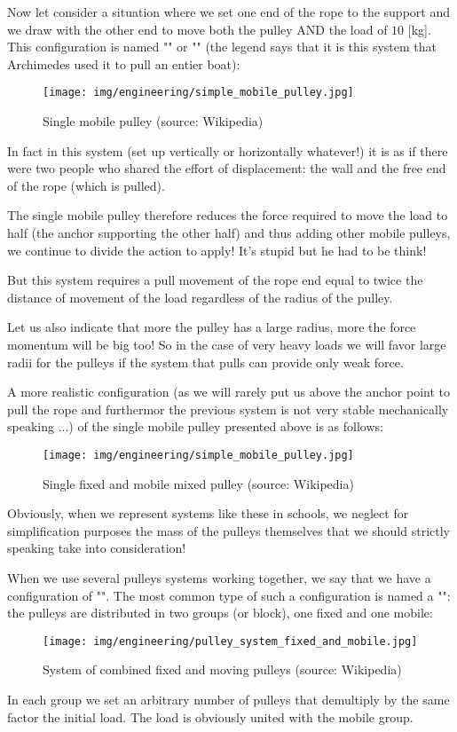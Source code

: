 	Now let consider a situation where we set one end of the rope to the support and we draw with the other end to move both the pulley AND the load of $10$ [kg]. This configuration is named "" or "" (the legend says that it is this system that Archimedes used it to pull an entier boat):
	\begin{figure}[H]
		\centering
		\texttt{[image: img/engineering/simple\_mobile\_pulley.jpg]}
		\caption{Single mobile pulley (source: Wikipedia)}
	\end{figure}
	In fact in this system (set up vertically or horizontally whatever!) it is as if there were two people who shared the effort of displacement: the wall and the free end of the rope (which is pulled).
	
	The single mobile pulley therefore reduces the force required to move the load to half (the anchor supporting the other half) and thus adding other mobile pulleys, we continue to divide the action to apply! It's stupid but he had to be think!
	
	But this system requires a pull movement of the rope end equal to twice the distance of movement of the load regardless of the radius of the pulley.
	
	Let us also indicate that more the pulley has a large radius, more the force momentum will be big too! So in the case of very heavy loads we will favor large radii for the pulleys if the system that pulls can provide only weak force.
	
	A more realistic configuration (as we will rarely put us above the anchor point to pull the rope and furthermor the previous system is not very stable mechanically speaking ...) of the single mobile pulley presented above is as follows:
	\begin{figure}[H]
		\centering
		\texttt{[image: img/engineering/simple\_mobile\_pulley.jpg]}
		\caption{Single fixed and mobile mixed pulley (source: Wikipedia)}
	\end{figure}
	Obviously, when we represent systems like these in schools, we neglect for simplification purposes the mass of the pulleys themselves that we should strictly speaking take into consideration!
	
	When we use several pulleys systems working together, we say that we have a configuration of "". The most common type of such a configuration is named a "": the pulleys are distributed in two groups (or block), one fixed and one mobile:
	\begin{figure}[H]
		\centering
		\texttt{[image: img/engineering/pulley\_system\_fixed\_and\_mobile.jpg]}
		\caption{System of combined fixed and moving pulleys (source: Wikipedia)}
	\end{figure}
	In each group we set an arbitrary number of pulleys that demultiply by the same factor the initial load. The load is obviously united with the mobile group.
	
